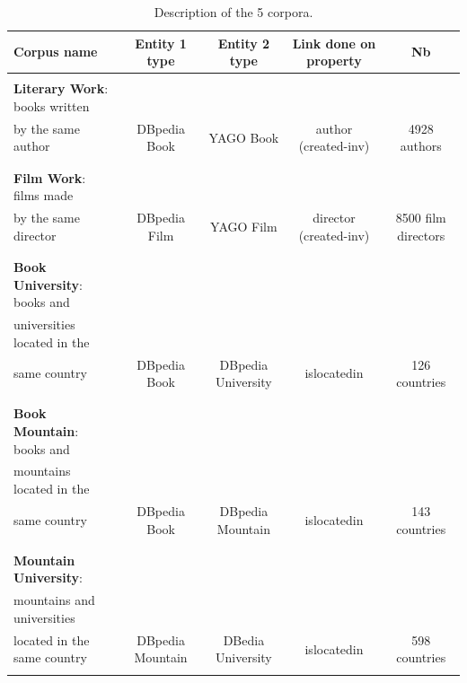 \documentclass[runningheads]{llncs}
\begin{document}
\begin{table}[]
    \centering
    \begin{tabular}{lcccc}
    \hline
    Corpus name & Entity 1 type & Entity 2 type & Link done on property & Nb   \\
    \hline
    &&&& \\
      \textbf{Literary Work}: books written  & & & & \\
      by the same author  & DBpedia Book & YAGO Book & author (created-inv) & 4928 authors\\
      & & & & \\
      \hline
      &&&& \\
      \textbf{Film Work}: films made  & & & & \\ 
      by the same director & DBpedia Film & YAGO Film & director (created-inv) & 8500 film directors \\
      & & & & \\
    \hline
    \hline
    &&&& \\
     \textbf{Book University}: books and & & & & \\ 
     universities located in the & & & & \\
     same country & DBpedia Book & DBpedia University & islocatedin & 126 countries \\
     & & & & \\
     \hline
     &&&& \\
     \textbf{Book Mountain}: books and &&&& \\
     mountains located in the &&&& \\
     same country& DBpedia Book & DBpedia Mountain & islocatedin & 143 countries\\
     & & & & \\
     \hline
     &&&& \\
     \textbf{Mountain University}: &&&& \\
     mountains and universities  &&&& \\
     located in the same country& DBpedia Mountain & DBedia University & islocatedin & 598 countries \\
     & & & & \\
     \hline
    \end{tabular}
    \caption{Description of the 5 corpora.}
    \label{tab:corpus-construction}
\end{table}
\end{document}
